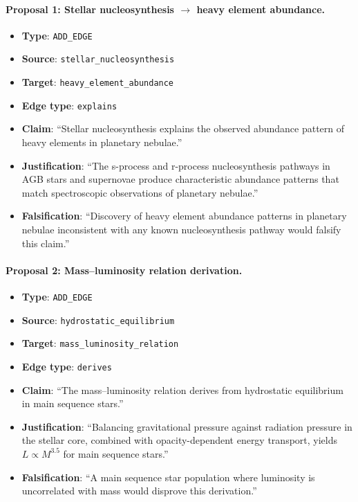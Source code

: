 \paragraph{Proposal 1: Stellar nucleosynthesis $\to$ heavy element abundance.}
\begin{itemize}[nosep]
  \item \textbf{Type}: \texttt{ADD\_EDGE}
  \item \textbf{Source}: \texttt{stellar\_nucleosynthesis}
  \item \textbf{Target}: \texttt{heavy\_element\_abundance}
  \item \textbf{Edge type}: \texttt{explains}
  \item \textbf{Claim}: ``Stellar nucleosynthesis explains the observed abundance
    pattern of heavy elements in planetary nebulae.''
  \item \textbf{Justification}: ``The s-process and r-process nucleosynthesis
    pathways in AGB stars and supernovae produce characteristic abundance
    patterns that match spectroscopic observations of planetary nebulae.''
  \item \textbf{Falsification}: ``Discovery of heavy element abundance patterns
    in planetary nebulae inconsistent with any known nucleosynthesis pathway
    would falsify this claim.''
\end{itemize}

\paragraph{Proposal 2: Mass--luminosity relation derivation.}
\begin{itemize}[nosep]
  \item \textbf{Type}: \texttt{ADD\_EDGE}
  \item \textbf{Source}: \texttt{hydrostatic\_equilibrium}
  \item \textbf{Target}: \texttt{mass\_luminosity\_relation}
  \item \textbf{Edge type}: \texttt{derives}
  \item \textbf{Claim}: ``The mass--luminosity relation derives from hydrostatic
    equilibrium in main sequence stars.''
  \item \textbf{Justification}: ``Balancing gravitational pressure against
    radiation pressure in the stellar core, combined with opacity-dependent
    energy transport, yields $L \propto M^{3.5}$ for main sequence stars.''
  \item \textbf{Falsification}: ``A main sequence star population where
    luminosity is uncorrelated with mass would disprove this derivation.''
\end{itemize}

